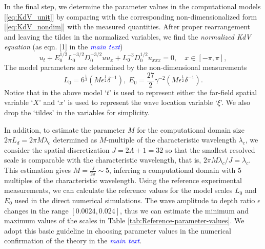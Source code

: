 \documentclass[9pt,twoside,lineno]{pnas-new}
\theoremstyle{plain}
\theoremstyle{plain}
\begin{document}
In the final step, we determine the parameter values in the computational
models [\ref{eq:KdV_unit}] by comparing with the corresponding non-dimensionalized
form [\ref{eq:KdV_nondim}] with the measured quantities. After proper
rearrangement and leaving the tildes in the normalized variables,
we find the \emph{normalized KdV equation} (as eqn. {[}1{]} in the
\textcolor{blue}{\emph{main text}}) 
\begin{equation}
u_{t}+E_{0}^{1/2}L_{0}^{-3/2}D_{0}^{-3/2}uu_{x}+L_{0}^{-3}D_{0}^{1/2}u_{xxx}=0,\quad x\in\left[-\pi,\pi\right],\label{eq:KdV_simu}
\end{equation}
The model parameters are determined by the non-dimensional measurements
\begin{equation}
L_{0}=6^{\frac{1}{3}}\left(M\epsilon^{\frac{1}{2}}\delta^{-1}\right),\;E_{0}=\frac{27}{2}\gamma^{-2}\left(M\epsilon^{\frac{1}{2}}\delta^{-1}\right).\label{eq:params-1}
\end{equation}
Notice that in the above model `$t$' is used to represent either
the far-field spatial variable `$X$' and `$x$' is used to represent
the wave location variable `$\xi$'. We also drop the `tildes' in
the variables for simplicity.

In addition, to estimate the parameter $M$ for the computational
domain size $2\pi L_{d}=2\pi M\lambda_{c}$ determined as $M$-multiple
of the characteristic wavelength $\lambda_{c}$, we consider the spatial
discretization $J=2\Lambda+1=32$ so that the smallest resolved scale
is comparable with the characteristic wavelength, that is, $2\pi M\lambda_{c}/J=\lambda_{c}$.
This estimation gives $M=\frac{J}{2\pi}\sim5$, inferring a computational
domain with 5 multiples of the characteristic wavelength. Using the
reference experimental measurements, we can calculate the reference
values for the model scales $L_{0}$ and $E_{0}$ used in the direct
numerical simulations. The wave amplitude to depth ratio $\epsilon$
changes in the range $\left[0.0024,0.024\right]$, thus we can estimate
the minimum and maximum values of the scales in Table \ref{tab:Reference-parameter-values}.
We adopt this basic guideline in choosing parameter values in the
numerical confirmation of the theory in the \textcolor{blue}{\emph{main text}}.
\end{document}

